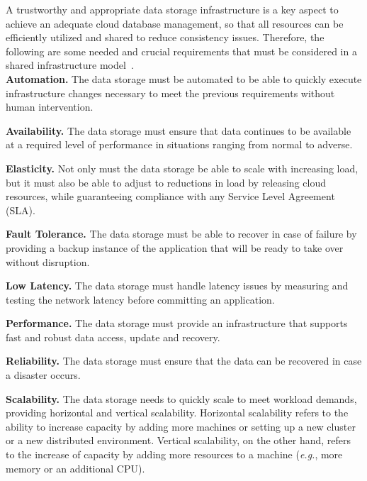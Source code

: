 A trustworthy and appropriate data storage infrastructure is a key aspect to achieve an adequate cloud database management, {\al so that} all resources can be efficiently utilized and shared to reduce consistency issues. Therefore, {\dg the following} 
are some needed and crucial requirements that must be considered in a shared infrastructure model~\cite{ju2011survey, rimal2009taxonomy}.\\

\noindent
\textbf{Automation.} The data storage must be automated to be able to quickly execute infrastructure changes necessary to meet the previous requirements without human intervention.

{\rc 
\noindent
\textbf{Availability.} The data storage must ensure that data continues to be available at a required level of performance in situations ranging from normal to adverse.
}

\noindent
\textbf{Elasticity.} Not only must the data storage be able to scale with increasing load, {\al but} it must also be able to adjust to reductions in load by releasing cloud resources, while guaranteeing compliance with any Service Level Agreement (SLA).

\noindent
\textbf{Fault Tolerance.} The data storage must be able to recover in case of failure by providing a backup instance of the application that will be ready to take over without disruption.

\noindent
\textbf{Low Latency.} The data storage must handle latency issues by measuring and testing the network latency before committing an application.

\noindent
\textbf{Performance.} The data storage must {\al provide} an infrastructure that {\al supports} fast and robust data access, update and recovery.

\noindent
\textbf{Reliability.} The data storage must ensure that the data {\dg can be recovered} in case a disaster {\dg occurs}.

\noindent
\textbf{Scalability.} The data storage needs to quickly scale to meet workload demands, %
providing horizontal and vertical scalability. Horizontal scalability  refers to the ability to increase capacity by adding more machines or setting up a new cluster or a new distributed environment. Vertical scalability, on the other hand, refers to the increase of capacity by adding more resources %
{\al to a machine (\emph{e.g.}, more memory or an additional CPU).}


